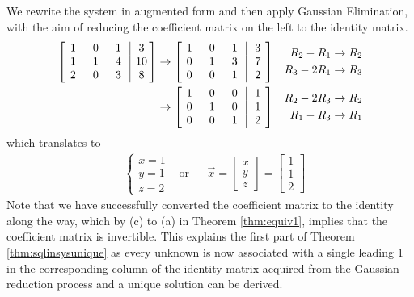 \begin{solution}
We rewrite the system in augmented form and then apply Gaussian Elimination, with the aim of reducing the coefficient matrix on the left to the identity matrix.
\begin{align*}
\left[\begin{array}{@{\,}wc{10pt}wc{10pt}wc{10pt}|wc{10pt}@{\,}}
1 & 0 & 1 & 3 \\
1 & 1 & 4 & 10 \\
2 & 0 & 3 & 8
\end{array}\right] 
& \to 
\left[\begin{array}{@{\,}wc{10pt}wc{10pt}wc{10pt}|wc{10pt}@{\,}}
1 & 0 & 1 & 3 \\
0 & 1 & 3 & 7 \\
0 & 0 & 1 & 2
\end{array}\right] 
& \begin{aligned}
R_2-R_1 &\to R_2 \\
R_3-2R_1 &\to R_3 
\end{aligned} \\
& \to 
\left[\begin{array}{@{\,}wc{10pt}wc{10pt}wc{10pt}|wc{10pt}@{\,}}
1 & 0 & 0 & 1 \\
0 & 1 & 0 & 1 \\
0 & 0 & 1 & 2
\end{array}\right] 
& 
\begin{aligned}
R_2-2R_3 &\to R_2 \\
R_1-R_3 &\to R_1    
\end{aligned}
\end{align*}
which translates to
\begin{align*}
&
\begin{cases}
x = 1 \\
y = 1 \\
z = 2
\end{cases}
& \text{or} &
& \vec{x} = 
\begin{bmatrix}
x \\
y \\
z
\end{bmatrix}
=
\begin{bmatrix}
1 \\
1 \\
2
\end{bmatrix}
\end{align*}
Note that we have successfully converted the coefficient matrix to the identity along the way, which by (c) to (a) in Theorem \ref{thm:equiv1}, implies that the coefficient matrix is invertible. This explains the first part of Theorem \ref{thm:sqlinsysunique} as every unknown is now associated with a single leading $1$ in the corresponding column of the identity matrix acquired from the Gaussian reduction process and a unique solution can be derived.
\end{solution}

